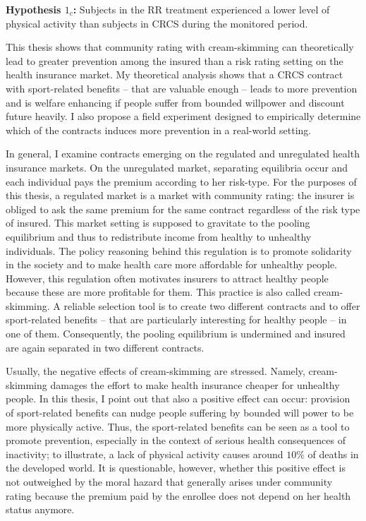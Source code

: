 \documentclass[12pt,english]{article}%
\makeatletter
\renewcommand{\section}{\@startsection{section}{1}{0mm}{-1.5\baselineskip}{0.8\baselineskip}{\normalfont\large\centering}}
\makeatother
\begin{document}
\textbf{Hypothesis $1_c$:} Subjects in the RR treatment experienced a lower level of physical activity than subjects in CRCS during the monitored period.  

\section{Conclusion}  
This thesis shows that community rating with cream-skimming can theoretically lead to greater prevention among the insured than a risk rating setting on the health insurance market. My theoretical analysis shows that a CRCS contract with sport-related benefits -- that are valuable enough -- leads to more prevention and is welfare enhancing if people suffer from bounded willpower and discount future heavily. I also propose a field experiment designed to empirically determine which of the contracts induces more prevention in a real-world setting. 

In general, I examine contracts emerging on the regulated and unregulated health insurance markets. On the unregulated market, separating equilibria occur and each individual pays the premium according to her risk-type. For the purposes of this thesis, a regulated market is a market with community rating: the insurer is obliged to ask the same premium for the same contract regardless of the risk type of insured. This market setting is supposed to gravitate to the pooling equilibrium and thus to redistribute income from healthy to unhealthy individuals. The policy reasoning behind this regulation is to promote solidarity in the society and to make health care more affordable for unhealthy people. However, this regulation often motivates insurers to attract healthy people because these are more profitable for them. This practice is also called cream-skimming. A reliable selection tool is to create two different contracts and to offer sport-related benefits -- that are particularly interesting for healthy people -- in one of them. Consequently, the pooling equilibrium is undermined and insured are again separated in two different contracts. 

Usually, the negative effects of cream-skimming are stressed. Namely, cream-skimming damages the effort to make health insurance cheaper for unhealthy people. In this thesis, I point out that also a positive effect can occur: provision of sport-related benefits can nudge people suffering by bounded will power to be more physically active. Thus, the sport-related benefits can be seen as a tool to promote prevention, especially in the context of serious health consequences of inactivity; to illustrate, a lack of physical activity causes around $10\%$ of deaths in the developed world. It is questionable, however, whether this positive effect is not outweighed by the moral hazard that generally arises under community rating because the premium paid by the enrollee does not depend on her health status anymore.
\end{document}
